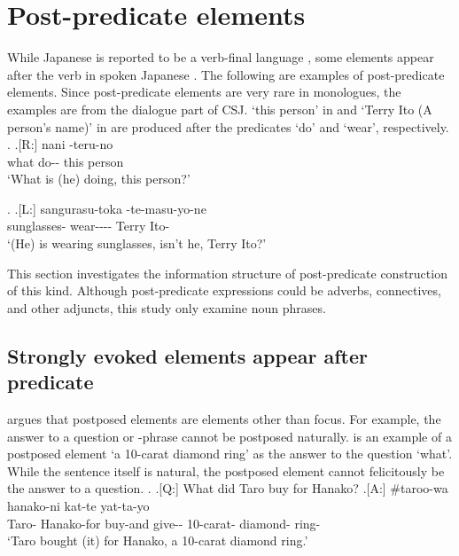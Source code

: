 \section{Post-predicate elements}\label{WOPostPreEles}

While Japanese is reported to be a verb-final language \cite{hinds86,shibatani90},
some elements appear after the verb in spoken Japanese \cite{kuno78,onosuzuki92,fujii95,takami95a,takami95b,ono06,nakagawaetal08_paper}.
The following are examples of post-predicate elements.
Since post-predicate elements are very rare in monologues,
the examples are from the dialogue part of CSJ.
 `this person' in \Next and  `Terry Ito (A person's name)' in \NNext are produced after the predicates  `do' and  `wear', respectively.
%
\ex.
\ag.[R:] nani -teru-no   \\
 		what do-- this person \\
		`What is (he) doing, this person?'

\ex.\label{D02F0015_TerryIto}
 \ag.[L:] sangurasu-toka -te-masu-yo-ne   \\
		sunglasses- wear---\ab{fp}- Terry Ito- \\
		`(He) is wearing sunglasses, isn't he, Terry Ito?'

This section investigates the information structure of post-predicate construction of this kind.
Although post-predicate expressions could be adverbs, connectives, and other adjuncts,
this study only examine noun phrases.

\subsection{Strongly evoked elements appear after predicate}\label{WORdis}

 argues that
postposed elements are elements other than focus.
For example,
the answer to a question or -phrase cannot be postposed naturally.
\Next is an example of a postposed element `a 10-carat diamond ring' as the answer to the question `what'.
While the sentence itself is natural,
the postposed element cannot felicitously be the answer to a question.
%
\ex.
 \a.[Q:] What did Taro buy for Hanako?
 \bg.[A:] \#taroo-wa hanako-ni kat-te yat-ta-yo    \\
 		Taro- Hanako-for buy-and give-- 10-carat- diamond- ring- \\
		`Taro bought (it) for Hanako, a 10-carat diamond ring.'


